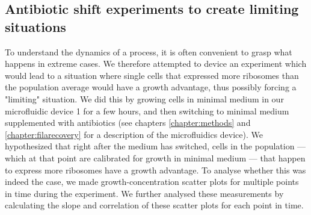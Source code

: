 \subsection{Antibiotic shift experiments to create limiting situations}
\label{section:ribo:shiftexperiments}


To understand the dynamics of a process, it is often convenient to grasp what happens in extreme cases.
%
We therefore attempted to device an experiment which would lead to a situation where single cells that expressed more ribosomes than the population average would have a growth advantage, thus possibly forcing a "limiting" situation.
% 
We did this by growing cells in minimal medium in our microfluidic device 1 for a few hours, and then switching to minimal medium supplemented with antibiotics (see chapters \ref{chapter:methods} and \ref{chapter:filarecovery} for a description of the microfluidics device).
%
We hypothesized that right after the medium has switched, cells in the population --- which at that point are calibrated for growth in minimal medium --- that happen to express more ribosomes have a growth advantage.
%
To analyse whether this was indeed the case, we made growth-concentration scatter plots for multiple points in time during the experiment.
%
We further analysed these measurements by calculating the slope and correlation of these scatter plots for each point in time.

